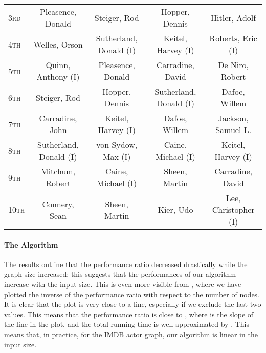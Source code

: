 \documentclass{acm_proc_article-sp}
\begin{document}
\begin{small}
\begin{table*}[b]
\begin{tabular}{|l|c|c|c|c|}
\textsc{3rd} &           Pleasence, Donald  &                Steiger, Rod  &              Hopper, Dennis  &               Hitler, Adolf \\ 
\textsc{4th} &               Welles, Orson  &      Sutherland, Donald (I)  &          Keitel, Harvey (I)  &           Roberts, Eric (I) \\ 
\textsc{5th} &          Quinn, Anthony (I)  &           Pleasence, Donald  &            Carradine, David  &             De Niro, Robert \\ 
\textsc{6th} &                Steiger, Rod  &              Hopper, Dennis  &      Sutherland, Donald (I)  &               Dafoe, Willem \\ 
\textsc{7th} &             Carradine, John  &          Keitel, Harvey (I)  &               Dafoe, Willem  &          Jackson, Samuel L. \\ 
\textsc{8th} &      Sutherland, Donald (I)  &          von Sydow, Max (I)  &          Caine, Michael (I)  &          Keitel, Harvey (I) \\ 
\textsc{9th} &             Mitchum, Robert  &          Caine, Michael (I)  &               Sheen, Martin  &            Carradine, David \\ 
\textsc{10th} &                Connery, Sean  &                Sheen, Martin  &                    Kier, Udo  &         Lee, Christopher (I) \\
\hline
\end{tabular}
\end{table*}
\end{small}

\paragraph{The Algorithm}
The results outline that the performance ratio decreased drastically while the graph size increased: this suggests that the performances of our algorithm increase with the input size. 
This is even more visible from , where we have plotted the inverse of the performance ratio with respect to the number of nodes. It is clear that the plot is very close to a line, especially if we exclude the last two values. This means that the performance ratio is close to , where  is the slope of the line in the plot, and the total running time is well approximated by . This means that, in practice, for the IMDB actor graph, our algorithm is linear in the input size.
\end{document}
